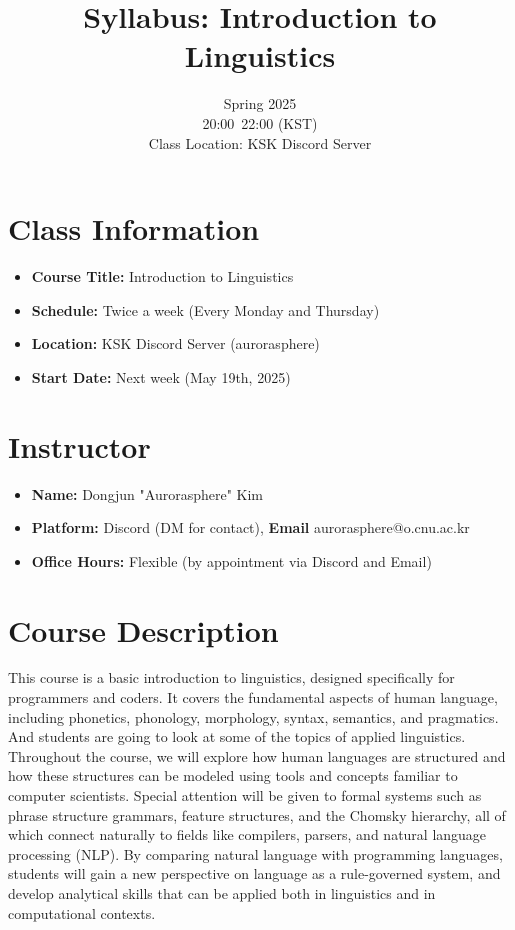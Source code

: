 \documentclass[12pt,oneside,a4paper]{oblivoir}
\title{Syllabus: Introduction to Linguistics}
\date{Spring 2025 \\ 20:00~22:00 (KST) \\ Class Location: KSK Discord Server}
\author{}
\begin{document}
\maketitle

\section*{Class Information}
\begin{itemize}[leftmargin=2em]
    \item \textbf{Course Title:} Introduction to Linguistics
    \item \textbf{Schedule:} Twice a week (Every Monday and Thursday)
    \item \textbf{Location:} KSK Discord Server (aurorasphere)
    \item \textbf{Start Date:} Next week (May 19th, 2025)
\end{itemize}

\section*{Instructor}
\begin{itemize}[leftmargin=2em]
    \item \textbf{Name:} Dongjun "Aurorasphere" Kim 
    \item \textbf{Platform:} Discord (DM for contact), \textbf{Email} aurorasphere@o.cnu.ac.kr
    \item \textbf{Office Hours:} Flexible (by appointment via Discord and Email)
\end{itemize}

\section*{Course Description}
This course is a basic introduction to linguistics, designed specifically for programmers and coders. 
It covers the fundamental aspects of human language, including phonetics, phonology, morphology, syntax, semantics, and pragmatics. And students are going to look at some of the topics of applied linguistics.
Throughout the course, we will explore how human languages are structured and how these structures can be modeled using tools and concepts familiar to computer scientists. Special attention will be given to formal systems such as phrase structure grammars, feature structures, and the Chomsky hierarchy, all of which connect naturally to fields like compilers, parsers, and natural language processing (NLP).
By comparing natural language with programming languages, students will gain a new perspective on language as a rule-governed system, and develop analytical skills that can be applied both in linguistics and in computational contexts.
\end{document}
